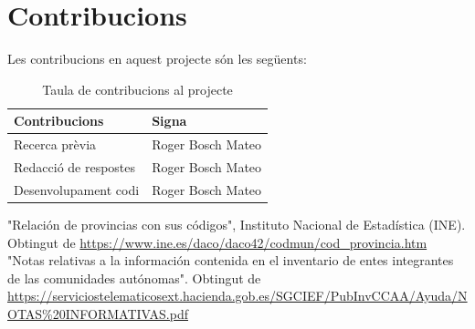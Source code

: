\documentclass[12pt]{article}
\begin{document}
\newpage
\section*{Contribucions}
Les contribucions en aquest projecte són les següents:
\begin{table}[h!]
    \centering
     \begin{tabular}{p{5cm}p{5cm}} 
     \hline
     \textbf{Contribucions} & \textbf{Signa} \\
     \hline
     Recerca prèvia & Roger Bosch Mateo \\
     Redacció de respostes & Roger Bosch Mateo \\
     Desenvolupament codi & Roger Bosch Mateo \\
     \hline
    \end{tabular}
    \caption{Taula de contribucions al projecte}
    \label{ComparativaAPITwitter}
\end{table}

\newpage
\begin{thebibliography}{9}
    "Relación de provincias con sus códigos", Instituto Nacional de Estadística (INE). Obtingut de \url{https://www.ine.es/daco/daco42/codmun/cod_provincia.htm}
    "Notas relativas a la información contenida en el inventario de entes integrantes de las comunidades autónomas". Obtingut de \url{https://serviciostelematicosext.hacienda.gob.es/SGCIEF/PubInvCCAA/Ayuda/NOTAS\%20INFORMATIVAS.pdf}
\end{thebibliography}
\end{document}
